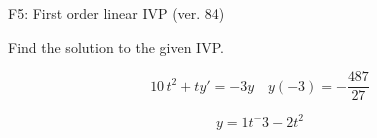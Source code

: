 \begin{exercise}
  \begin{exerciseTitle}F5: First order linear IVP (ver. 84)\end{exerciseTitle}
  \begin{exerciseStatement}
    
Find the solution to the given IVP.

    
\[10 \, t^{2} +ty'= -3 y \hspace{1em} y( -3 ) = -\frac{487}{27}\]

  \end{exerciseStatement}
  \begin{exerciseAnswer}
    
\[y= 1 t^ -3 -2 t^{2}\]

  \end{exerciseAnswer}
\end{exercise}